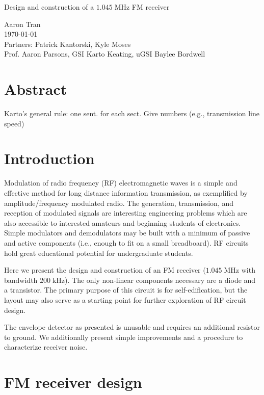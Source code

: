 \documentclass[11pt]{article}
\newcommand {\mt}{\mathrm}
\newcommand {\unit}[1]{\; \mt{#1}}
\begin{document}
\begin{center}
\Large{Design and construction of a $1.045 \unit{MHz}$ FM receiver}

\large
Aaron Tran \\
\today \\
Partners: Patrick Kantorski, Kyle Moses \\
Prof. Aaron Parsons, GSI Karto Keating, uGSI Baylee Bordwell
\end{center}

\section*{\sffamily Abstract}

Karto's general rule: one sent. for each sect.
Give numbers (e.g., transmission line speed)

\section{Introduction}

Modulation of radio frequency (RF) electromagnetic waves is a simple and
effective method for long distance information transmission, as exemplified by
amplitude/frequency modulated radio.  The generation, transmission, and
reception of modulated signals are interesting engineering problems which are
also accessible to interested amateurs and beginning students of electronics.
Simple modulators and demodulators may be built with a minimum
of passive and active components (i.e., enough to fit on a small breadboard).
RF circuits hold great educational potential for undergraduate students.

Here we present the design and construction of an FM receiver ($1.045
\unit{MHz}$ with bandwidth $200 \unit{kHz}$).  The only non-linear components
necessary are a diode and a transistor.  The primary purpose of this circuit is for self-edification, but the layout may also serve as a starting point for
further exploration of RF circuit design.

The envelope detector as presented is unusable and requires an additional
resistor to ground.  We additionally present simple improvements and a
procedure to characterize receiver noise.

\section{FM receiver design}
\end{document}
